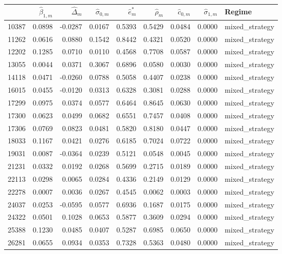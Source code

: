\begin{tabular}{lrrrrrrrl}
\toprule
 & $\hat{\beta}_{1,m}$ & $\hat{\Delta}_m$ & $\hat{\sigma}_{0,m}$ & $\hat{e}^*_m$ & $\hat{\rho}_m$ & $\hat{c}_{0,m}$ & $\hat{\sigma}_{1,m}$ & Regime \\
\midrule
10387 & 0.0898 & -0.0287 & 0.0167 & 0.5393 & 0.5429 & 0.0484 & 0.0000 & mixed_strategy \\
11262 & 0.0616 & 0.0880 & 0.1542 & 0.8442 & 0.4321 & 0.0520 & 0.0000 & mixed_strategy \\
12202 & 0.1285 & 0.0710 & 0.0110 & 0.4568 & 0.7708 & 0.0587 & 0.0000 & mixed_strategy \\
13055 & 0.0044 & 0.0371 & 0.3067 & 0.6896 & 0.0580 & 0.0030 & 0.0000 & mixed_strategy \\
14118 & 0.0471 & -0.0260 & 0.0788 & 0.5058 & 0.4407 & 0.0238 & 0.0000 & mixed_strategy \\
16015 & 0.0455 & -0.0120 & 0.0313 & 0.6328 & 0.3081 & 0.0288 & 0.0000 & mixed_strategy \\
17299 & 0.0975 & 0.0374 & 0.0577 & 0.6464 & 0.8645 & 0.0630 & 0.0000 & mixed_strategy \\
17300 & 0.0623 & 0.0499 & 0.0682 & 0.6551 & 0.7457 & 0.0408 & 0.0000 & mixed_strategy \\
17306 & 0.0769 & 0.0823 & 0.0481 & 0.5820 & 0.8180 & 0.0447 & 0.0000 & mixed_strategy \\
18033 & 0.1167 & 0.0421 & 0.0276 & 0.6185 & 0.7024 & 0.0722 & 0.0000 & mixed_strategy \\
19031 & 0.0087 & -0.0364 & 0.0239 & 0.5121 & 0.0548 & 0.0045 & 0.0000 & mixed_strategy \\
21231 & 0.0332 & 0.0192 & 0.0268 & 0.5699 & 0.2715 & 0.0189 & 0.0000 & mixed_strategy \\
22113 & 0.0298 & 0.0065 & 0.0284 & 0.4336 & 0.2149 & 0.0129 & 0.0000 & mixed_strategy \\
22278 & 0.0007 & 0.0036 & 0.0267 & 0.4545 & 0.0062 & 0.0003 & 0.0000 & mixed_strategy \\
24037 & 0.0253 & -0.0595 & 0.0577 & 0.6936 & 0.1687 & 0.0175 & 0.0000 & mixed_strategy \\
24322 & 0.0501 & 0.1028 & 0.0653 & 0.5877 & 0.3609 & 0.0294 & 0.0000 & mixed_strategy \\
25388 & 0.1230 & 0.0485 & 0.0407 & 0.5287 & 0.6985 & 0.0650 & 0.0000 & mixed_strategy \\
26281 & 0.0655 & 0.0934 & 0.0353 & 0.7328 & 0.5363 & 0.0480 & 0.0000 & mixed_strategy \\

\end{tabular}

